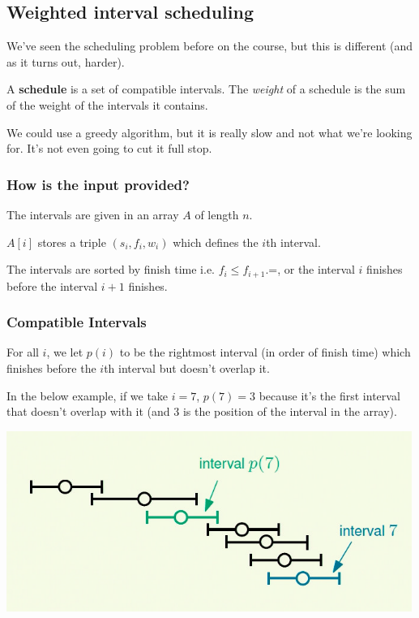\documentclass[11pt,a4paper,titlepage,dvipsnames,cmyk]{scrartcl}
\begin{document}
\subsection{Weighted interval scheduling}%
\label{sub:weighted-scheduling}
We've seen the scheduling problem before on the course, but this is
different (and as it turns out, harder).

A \textbf{schedule} is a set of compatible intervals. The \textit{weight}
of a schedule is the sum of the weight of the intervals it contains.

We could use a greedy algorithm, but it is really slow and not what we're
looking for. It's not even going to cut it full stop.

\subsubsection*{How is the input provided?}
The intervals are given in an array $A$ of length $n$.

$A[i]$ stores a triple $(s_i, f_i, w_i)$ which defines the $i$th interval.

The intervals are sorted by finish time i.e. $f_i \le f_{i+1}$.=, or the
interval $i$ finishes before the interval $i+1$ finishes.

\subsubsection*{Compatible Intervals}
For all $i$, we let $p(i)$ to be the rightmost interval (in order of
finish time) which finishes before the $i$th interval but doesn't overlap
it.

In the below example, if we take $i = 7$, $p(7) = 3$ because it's the
first interval that doesn't overlap with it (and 3 is the position of the
interval in the array).

\begin{center}
    \includegraphics[scale=.5]{weighted-int.png}
\end{center}
\end{document}
